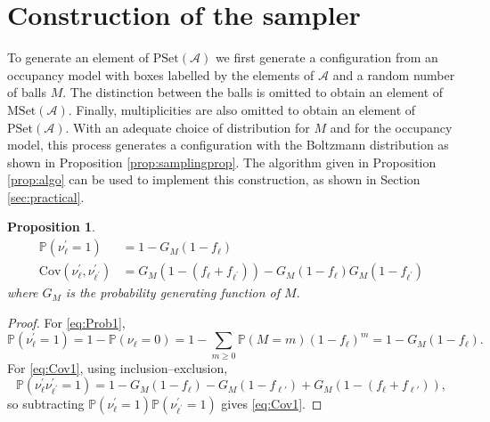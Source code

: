 \documentclass[a4paper,10pt]{article}
\newtheorem{proposition}[theorem]{Proposition}
\theoremstyle{definition}
\newcommand{\PP}{\mathbb{P}}
\newcommand{\cov}{\mathrm{Cov}}
\newcommand{\Aa}{\mathcal{A}}
\newcommand{\PSet}{\mathrm{PSet}}
\newcommand{\MSet}{\mathrm{MSet}}
\begin{document}
\section{Construction of the sampler}\label{sec:theory}
To generate an element of $\PSet(\Aa)$ we first generate a configuration from an occupancy model with boxes labelled by the elements of $\Aa$ and a random number of balls $M$. The distinction between the balls is omitted to obtain an element of $\MSet(\Aa)$. Finally, multiplicities are also omitted to obtain an element of $\PSet(\Aa)$. With an adequate choice of distribution for $M$ and for the occupancy model, this process generates a configuration with the Boltzmann distribution as shown in Proposition \ref{prop:samplingprop}. The algorithm given in Proposition \ref{prop:algo} can be used to implement this construction, as shown in Section \ref{sec:practical}.
\begin{proposition}\label{prop:ProbCov1}
\begin{align}
    \PP(\nu^{\prime}_\ell = 1) &= 1-G_M(1-f_\ell) \label{eq:Prob1}\\
    \cov(\nu^{\prime}_\ell, \nu^{\prime}_{\ell^\prime}) &= G_M(1-(f_\ell+f_{\ell^\prime}))-G_M(1-f_\ell)G_M(1-f_{\ell^\prime}) \label{eq:Cov1}
\end{align}
where $G_M$ is the probability generating function of $M$.
\end{proposition}

\begin{proof}
For \eqref{eq:Prob1},
\begin{equation*}
\PP(\nu^{\prime}_\ell = 1)=1-\PP(\nu_\ell=0)=1-\sum_{m\ge 0}\PP(M=m)(1-f_\ell)^m=1-G_M(1-f_\ell).
\end{equation*}
For \eqref{eq:Cov1}, using inclusion--exclusion,
\begin{equation*}
\PP(\nu^{\prime}_\ell \nu^{\prime}_{\ell^\prime}=1)=1-G_M(1-f_\ell)-G_M(1-f_{\ell'})+G_M(1-(f_\ell+f_{\ell'})),
\end{equation*}
so subtracting $\PP(\nu^{\prime}_\ell = 1)\PP(\nu^{\prime}_{\ell^\prime} = 1)$ gives \eqref{eq:Cov1}.
\end{proof}
\end{document}
